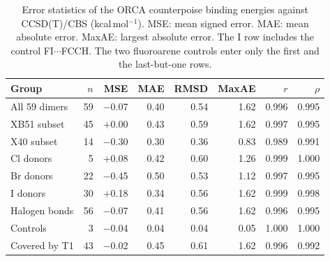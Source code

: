 \begin{table}[!htbp]\centering\footnotesize
\caption{Error statistics of the ORCA counterpoise binding energies against CCSD(T)/CBS (kcal\,mol$^{-1}$). MSE: mean signed error. MAE: mean absolute error. MaxAE: largest absolute error. The I row includes the control FI$\cdots$FCCH. The two fluoroarene controls enter only the first and the last-but-one rows.}\label{tab:cpstat}
\begin{tabular}{lrrrrrrr}\toprule Group & $n$ & MSE & MAE & RMSD & MaxAE & $r$ & $\rho$\\\midrule
All 59 dimers & 59 & $-$0.07 & 0.40 & 0.54 & 1.62 & 0.996 & 0.995\\
XB51 subset & 45 & +0.00 & 0.43 & 0.59 & 1.62 & 0.997 & 0.995\\
X40 subset & 14 & $-$0.30 & 0.30 & 0.36 & 0.83 & 0.989 & 0.991\\
Cl donors & 5 & +0.08 & 0.42 & 0.60 & 1.26 & 0.999 & 1.000\\
Br donors & 22 & $-$0.45 & 0.50 & 0.53 & 1.12 & 0.997 & 0.995\\
I donors & 30 & +0.18 & 0.34 & 0.56 & 1.62 & 0.999 & 0.998\\
Halogen bonds & 56 & $-$0.07 & 0.41 & 0.56 & 1.62 & 0.996 & 0.995\\
Controls & 3 & $-$0.04 & 0.04 & 0.04 & 0.05 & 1.000 & 1.000\\
Covered by T1 & 43 & $-$0.02 & 0.45 & 0.61 & 1.62 & 0.996 & 0.992\\
\bottomrule\end{tabular}\end{table}
